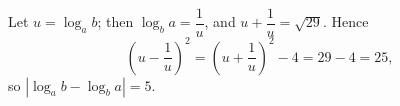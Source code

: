 Let $u=\log_a b$; then $\log_b a=\dfrac{1}{u}$, and $u+\dfrac{1}{u}=\sqrt{29}$. Hence
\[
\left(u-\dfrac{1}{u}\right)^2=\left(u+\dfrac{1}{u}\right)^2-4=29-4=25,
\]
so $\left|\log_a b-\log_b a\right|=\boxed{5}$.
